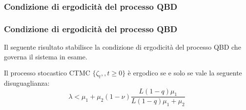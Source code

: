 \documentclass{beamer}
\begin{document}

\subsubsection{Condizione di ergodicità del processo QBD}


\begin{frame}
    \frametitle{Condizione di ergodicità del processo QBD}
    Il seguente risultato stabilisce la condizione di ergodicità del processo QBD che governa il sistema in esame.
    \begin{theorem}
        Il processo stocastico CTMC $\{\zeta_t,,t\geq 0\}$ è ergodico se e solo se vale la seguente disuguaglianza:
        \begin{equation*}\label{eq:ergodicity}
            \lambda < \mu_1 + \mu_2(1 - \nu) \frac{L(1-q)\mu_1}{L(1-q)\mu_1 + \mu_2}
        \end{equation*}
    \end{theorem}
\end{frame}
\end{document}

